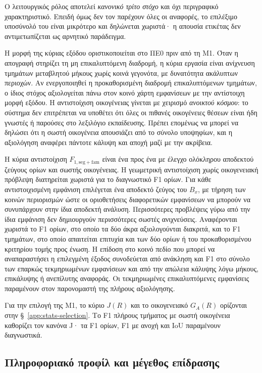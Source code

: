 \documentclass[11pt,a4paper]{article}
\begin{document}
Ο λειτουργικός ρόλος αποτελεί \emph{κανονικό τρίτο στόχο} και όχι περιγραφικό χαρακτηριστικό. Επειδή όμως δεν τον παρέχουν όλες οι αναφορές, το επιλέξιμο υποσύνολό του είναι μικρότερο και δηλώνεται χωριστά· η απουσία ετικέτας δεν αντιμετωπίζεται ως αρνητικό παράδειγμα.

Η μορφή της κύριας εξόδου οριστικοποιείται στο ΠΕ0 πριν από τη M1. Όταν η απογραφή στηρίζει τη μη επικαλυπτόμενη διαδρομή, η κύρια εργασία είναι ανίχνευση τμημάτων μεταβλητού μήκους χωρίς κοινά γεγονότα, με δυνατότητα ακάλυπτων περιοχών. Αν ενεργοποιηθεί η προκαθορισμένη διαδρομή επικαλυπτόμενων τμημάτων, ο ίδιος στόχος αξιολογείται πάνω στον κοινό χάρτη εμφανίσεων με την αντίστοιχη μορφή εξόδου. Η αντιστοίχιση οικογένειας γίνεται με χειρισμό \emph{ανοικτού κόσμου}: το σύστημα δεν επιτρέπεται να υποθέτει ότι όλες οι πιθανές οικογένειες θέσεων είναι ήδη γνωστές ή παρούσες στο λεξιλόγιο εκπαίδευσης. Πρέπει επομένως να μπορεί να δηλώσει ότι η σωστή οικογένεια απουσιάζει από το σύνολο υποψηφίων, και η αξιολόγηση αναφέρει πάντοτε κάλυψη και αποχή μαζί με την ακρίβεια.

Η κύρια αντιστοίχιση $F_{1,\mathrm{seg+fam}}$ είναι ένα προς ένα με έλεγχο ολόκληρου αποδεκτού ζεύγους ορίων και σωστής οικογένειας. Η γεωμετρική αντιστοίχιση χωρίς οικογενειακή πρόβλεψη διατηρείται χωριστά για το διαγνωστικό F1 ορίων. Για κάθε αντιστοιχισμένη εμφάνιση επιλέγεται ένα αποδεκτό ζεύγος του $B_x$, με τήρηση των κοινών περιορισμών ώστε οι οριοθετήσεις διαφορετικών εμφανίσεων να μπορούν να συνυπάρχουν στην ίδια αποδεκτή ανάλυση. Περισσότερες προβλέψεις γύρω από την ίδια εμφάνιση δεν δημιουργούν περισσότερες σωστές ανιχνεύσεις. Αναφέρονται χωριστά το F1 ορίων, στο οποίο τα δύο άκρα αξιολογούνται διακριτά, και το F1 τμημάτων, στο οποίο απαιτείται επιτυχία και των δύο ορίων ή του προκαθορισμένου κριτηρίου τομής προς ένωση. Η επίδοση στο κοινό πεδίο που μπορεί να αναπαραστήσει η επιλεγμένη έξοδος συνοδεύεται από ανάκληση και F1 στο σύνολο των επαρκώς τεκμηριωμένων εμφανίσεων και από την απώλεια κάλυψης λόγω μήκους, επικάλυψης ή ανεπίλυτης αναφοράς. Οι τεκμηριωμένες επικαλυπτόμενες εμφανίσεις παραμένουν στον παρονομαστή της πλήρους αξιολόγησης.

Για την επιλογή της M1, το κύριο $J(R)$ και το οικογενειακό $G_A(R)$ ορίζονται στην §~\ref{app:stats-selection}. Το F1 πλήρους τμήματος με σωστή οικογένεια καθορίζει τον κανόνα J· τα F1 ορίων, F1 με ανοχή και IoU παραμένουν διαγνωστικά.

\subsection{Πληροφοριακό προφίλ και μέγεθος επίδρασης}\label{app:stats-axisB}
\end{document}
